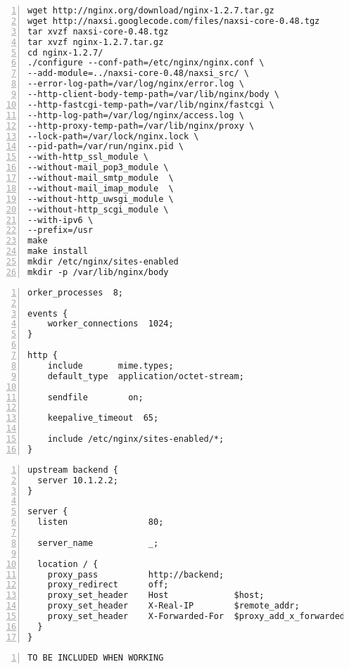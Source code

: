 \documentclass[Configuration]{subfiles}
\begin{document}
\begin{lstlisting}[frame=single,caption=Compiling nginx+naxsi,backgroundcolor=\color{gray},breaklines=true,numbers=left,]
wget http://nginx.org/download/nginx-1.2.7.tar.gz
wget http://naxsi.googlecode.com/files/naxsi-core-0.48.tgz
tar xvzf naxsi-core-0.48.tgz
tar xvzf nginx-1.2.7.tar.gz
cd nginx-1.2.7/
./configure --conf-path=/etc/nginx/nginx.conf \
--add-module=../naxsi-core-0.48/naxsi_src/ \
--error-log-path=/var/log/nginx/error.log \
--http-client-body-temp-path=/var/lib/nginx/body \
--http-fastcgi-temp-path=/var/lib/nginx/fastcgi \
--http-log-path=/var/log/nginx/access.log \
--http-proxy-temp-path=/var/lib/nginx/proxy \
--lock-path=/var/lock/nginx.lock \
--pid-path=/var/run/nginx.pid \
--with-http_ssl_module \
--without-mail_pop3_module \
--without-mail_smtp_module  \
--without-mail_imap_module  \
--without-http_uwsgi_module \
--without-http_scgi_module \
--with-ipv6 \
--prefix=/usr
make
make install
mkdir /etc/nginx/sites-enabled
mkdir -p /var/lib/nginx/body
\end{lstlisting}

\begin{lstlisting}[frame=single,caption=/etc/nginx/nginx.conf,backgroundcolor=\color{gray},breaklines=true,numbers=left,]
orker_processes  8;

events {
    worker_connections  1024;
}

http {
    include       mime.types;
    default_type  application/octet-stream;

    sendfile        on;

    keepalive_timeout  65;

    include /etc/nginx/sites-enabled/*;
}
\end{lstlisting}

\begin{lstlisting}[frame=single,caption=/etc/nginx/sites-enabled/wordpress,backgroundcolor=\color{gray},breaklines=true,numbers=left,]
upstream backend {
  server 10.1.2.2;
}

server {
  listen                80;

  server_name           _;

  location / {
    proxy_pass          http://backend;
    proxy_redirect      off;
    proxy_set_header    Host             $host;
    proxy_set_header    X-Real-IP        $remote_addr;
    proxy_set_header    X-Forwarded-For  $proxy_add_x_forwarded_for;
  }
}
\end{lstlisting}

\begin{lstlisting}[frame=single,caption=/etc/nginx/nbs.rules,backgroundcolor=\color{gray},breaklines=true,numbers=left,]
TO BE INCLUDED WHEN WORKING
\end{lstlisting}
\end{document}
